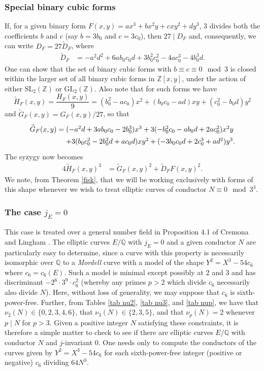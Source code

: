 \subsubsection{Special binary cubic forms} \label{dahlia}
If, for a given binary form $F(x,y)=a x^3 + b x^2 y + c xy^2 + d y^3$, 3 divides both the coefficients $b$ and $c$ (say $b = 3 b_0$ and 
$c=3 c_0$), then  $27 \mid D_F$ and, consequently, we can write $D_F=27 \widetilde{D}_F$, where
\begin{align*}
\widetilde{D}_F &= -a^2d^2+6ab_0c_0d+3b_0^2c_0^2-4ac_0^3-4b_0^3d.
\end{align*}
One can show that the set of binary cubic forms with $b \equiv c \equiv 0 \mod{3}$ is closed within the larger set of all binary 
cubic forms in $\mathbb{Z}[x,y]$, under the action of either $\mbox{SL}_2 ( \mathbb{Z})$ or $\mbox{GL}_2 ( \mathbb{Z})$. 
Also note that for such forms we have
$$
 \widetilde{H}_F(x,y) = \frac{H_F(x,y)}{9}= (b_0^2-ac_0) x^2 + (b_0c_0-ad) xy + (c_0^2-b_0d) y^2 
$$
and $\widetilde{G}_F (x,y) =  G_F(x,y)/27$, so that
$$
\arraycolsep=1.4pt\def\arraystretch{1.4}
\begin{array}{cl} 
\widetilde{G}_F (x,y) = & (-a^2d+3ab_0c_0-2b_0^3) x^3 + 3 (-b_0^2c_0-ab_0d+2ac_0^2) x^2 y \\
 & + 3 (b_0c_0^2-2b_0^2d+ac_0d) x y^2 + (-3b_0c_0d+2c_0^3+ad^2) y^3. \\
 \end{array}
$$
The syzygy now becomes
\begin{align} \label{syz2}
4\widetilde{H}_F (x,y)^3 &=\widetilde{G}_F(x,y)^2+\widetilde{D}_F F(x,y)^2.
\end{align}
We note, from Theorem \ref{fisk}, that we will be working exclusively with forms of this shape whenever we wish to treat elliptic curves of conductor $N \equiv 0 \mod{3^3}$.

\subsubsection{The case $j_E = 0$} \label{Mordell}
This case is treated over a general number field in Proposition 4.1 of Cremona and Lingham \cite{CrLi}.
The elliptic curves $E/\mathbb{Q}$ with $j_E=0$ and a given conductor $N$ are particularly easy to determine, since a curve with this property is necessarily isomorphic over $\mathbb{Q}$ to a {\it Mordell} curve with a model of the shape $Y^2 = X^3  - 54 c_6$ where $c_6=c_6(E)$. Such a model is minimal except possibly at $2$ and $3$ and has discriminant 
$-2^6 \cdot 3^9 \cdot c_6^2$ (whereby any primes $p > 2$ which divide $c_6$  necessarily also divide $N$). Here, without loss of generality, we may suppose that $c_6$ is sixth-power-free.
Further, from Tables \ref{tab nu2}, \ref{tab nu3}, and \ref{tab nup}, we have that $\nu_2(N) \in \{ 0, 2, 3, 4, 6 \}$, that $\nu_3 (N) \in \{ 2, 3, 5 \}$, and that $\nu_p(N)=2$ whenever $p \mid N$ for $p > 3$. Given a positive integer $N$ satisfying these constraints, it is therefore a simple matter to check to see if there are elliptic curves $E/\mathbb{Q}$ with conductor $N$ and $j$-invariant $0$. One needs only to compute the conductors of the curves given by $Y^2 = X^3  - 54 c_6$ for each sixth-power-free integer (positive or negative) $c_6$ dividing $64 N^3$.


